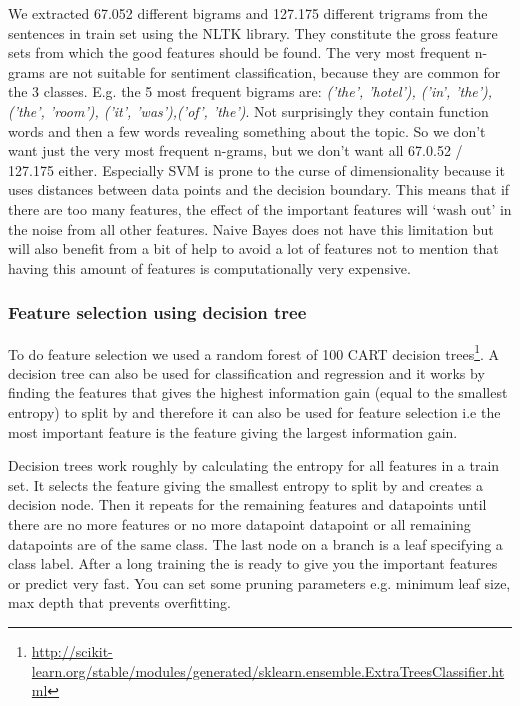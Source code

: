 \documentclass{article}
\begin{document}
We extracted 67.052 different bigrams and 127.175 different trigrams from the sentences in train set using the NLTK library. They constitute the gross feature sets from which the good features should be found. The very most frequent n-grams are not suitable for sentiment classification, because they are common for the 3 classes. E.g. the 5 most frequent bigrams are: \textit{('the', 'hotel'), ('in', 'the'), ('the', 'room'), ('it', 'was'),('of', 'the')}. Not surprisingly they contain function words and then a few words revealing something about the topic. So we don’t want just the very most frequent n-grams, but we don’t want all 67.0.52 / 127.175 either. Especially SVM is prone to the curse of dimensionality because it uses distances between data points and the decision boundary. This means that if there are too many features, the effect of the important features will ‘wash out’ in the noise from all other features. Naive Bayes does not have this limitation but will also benefit from a bit of help to avoid a lot of features not to mention that having this amount of features is computationally very expensive.

\subsubsection{Feature selection using decision tree}
To do feature selection we used a random forest of 100 CART decision trees\footnote{\url{http://scikit-learn.org/stable/modules/generated/sklearn.ensemble.ExtraTreesClassifier.html}}. A decision tree can also be used for classification and regression and it works by finding the features that gives the highest information gain (equal to the smallest entropy) to split by and therefore it can also be used for feature selection i.e the most important feature is the feature giving the largest information gain. 

Decision trees work roughly by calculating the entropy for all features in a train set. It selects the feature giving the smallest entropy to split by and creates a decision node. 
Then it repeats for the remaining features and datapoints until there are no more features or no more datapoint datapoint or all remaining datapoints are of the same class. The last node on a branch is a leaf specifying a class label. After a long training the is ready to give you the important features or predict very fast. You can set some pruning parameters e.g. minimum leaf size, max depth that prevents overfitting. 
\end{document}
